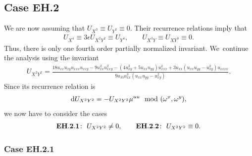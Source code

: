 \documentclass[10pt,a4paper]{amsart}
\numberwithin{equation}{section}
\begin{document}
\subsection{Case EH.2}

We are now assuming that $U_{X^3} \equiv U_{Y^3}\equiv 0$. Their recurrence relations imply that
%
\begin{gather}\label{eq:EH.2 constraints}
U_{X^4} \equiv 3\epsilon U_{X^2Y^2}\equiv U_{Y^4},\qquad U_{X^3Y}\equiv U_{XY^3}\equiv 0.
\end{gather}
%
Thus, there is only one fourth order partially normalized invariant. We~continue the analysis using the invariant
%
\begin{gather*}
U_{X^2Y^2} = \frac{18u_{xx}u_{xy}u_{xxx}u_{xxy}\!-\!9u_{xx}^2u_{xxy}^2\!-\!(4u_{xy}^2 \!+\!5u_{xx}u_{yy})u_{xxx}^2\!+\!3u_{xx}(u_{xx}u_{yy}\!-\!u_{xy}^2)u_{xxxx}}{9 a_{33} u_{xx}^3(u_{xx}u_{yy}-u_{xy}^2)}.
\end{gather*}
%
Since its recurrence relation is
\begin{gather*}
{\rm d}U_{X^2Y^2} = - U_{X^2Y^2}\mu^{uu} \mod(\omega^x,\omega^y),
\end{gather*}
we now have to consider the cases
\begin{gather*}
{\bf EH.2.1}\colon\ U_{X^2Y^2}\neq 0,\qquad
{\bf EH.2.2}\colon\ U_{X^2Y^2}\equiv 0.
\end{gather*}

\subsubsection{Case EH.2.1}
\end{document}
